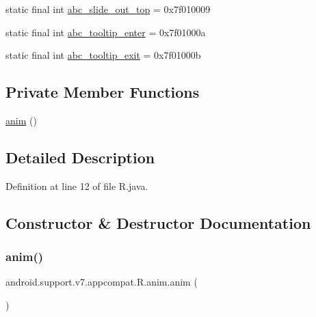 \begin{DoxyCompactItemize}
\item 
static final int \mbox{\hyperlink{classandroid_1_1support_1_1v7_1_1appcompat_1_1_r_1_1anim_aeeecf1b8df70f0cdb528bf29ffc04fa8}{abc\+\_\+slide\+\_\+out\+\_\+top}} = 0x7f010009
\item 
static final int \mbox{\hyperlink{classandroid_1_1support_1_1v7_1_1appcompat_1_1_r_1_1anim_a48bf3ae33d447cbde3d73a282b5c81ef}{abc\+\_\+tooltip\+\_\+enter}} = 0x7f01000a
\item 
static final int \mbox{\hyperlink{classandroid_1_1support_1_1v7_1_1appcompat_1_1_r_1_1anim_a497b957ed79509d03b990691d9bd02a3}{abc\+\_\+tooltip\+\_\+exit}} = 0x7f01000b
\end{DoxyCompactItemize}
\subsection*{Private Member Functions}
\begin{DoxyCompactItemize}
\item 
\mbox{\hyperlink{classandroid_1_1support_1_1v7_1_1appcompat_1_1_r_1_1anim_a4f75993635f3037ddda5d6e3e8dda47d}{anim}} ()
\end{DoxyCompactItemize}


\subsection{Detailed Description}


Definition at line 12 of file R.\+java.



\subsection{Constructor \& Destructor Documentation}
\mbox{\label{classandroid_1_1support_1_1v7_1_1appcompat_1_1_r_1_1anim_a4f75993635f3037ddda5d6e3e8dda47d}} 
\subsubsection{\texorpdfstring{anim()}{anim()}}
{\footnotesize\ttfamily android.\+support.\+v7.\+appcompat.\+R.\+anim.\+anim (\begin{DoxyParamCaption}{ }\end{DoxyParamCaption})\hspace{0.3cm}{\ttfamily [private]}}



